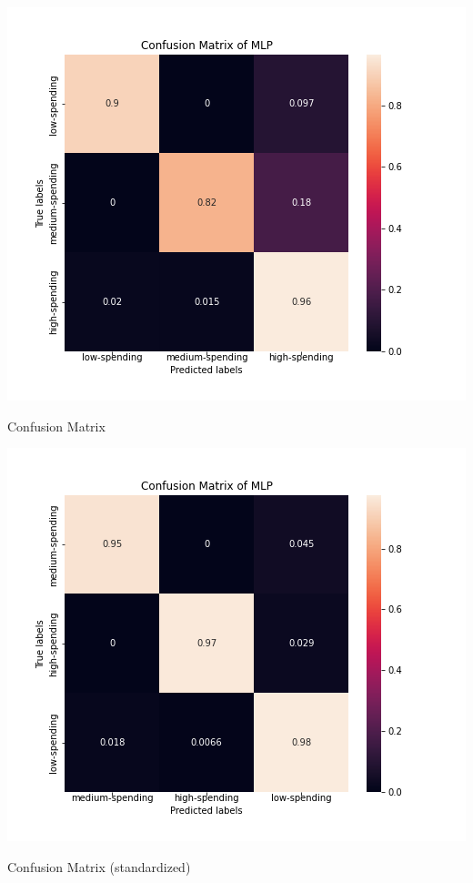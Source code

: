 \documentclass[12pt]{article}
\begin{document}
\begin{table}[ht]
\begin{minipage}[b]{0.5\linewidth}
\centering
    \includegraphics[scale=0.5]{images/mlp-confusionmatrix_without_std.png}
\caption{Confusion Matrix}
\label{fig:mlp_conf}
\end{minipage}
\begin{minipage}[b]{0.5\linewidth}
\centering
    \includegraphics[scale=0.5]{images/mlp-confusionmatrix.png}
\caption{Confusion Matrix (standardized)}
\label{fig:mlp_conf2}
\end{minipage}
\end{table}
\end{document}
